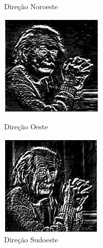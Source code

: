 \documentclass[a4paper, 12pt]{article}
\begin{document}
\begin{figure}[!htbp]
	  	\caption{Direção Noroeste}
	\endminipage\hspace{1cm}
		\includegraphics[width=\linewidth]{images/kirsch4.jpg}
		\caption{Direção Oeste}
  	\endminipage\hspace{1cm}
  		\includegraphics[width=\linewidth]{images/kirsch5.jpg}
  		\caption{Direção Sudoeste}
	\endminipage
\end{figure}
\end{document}

